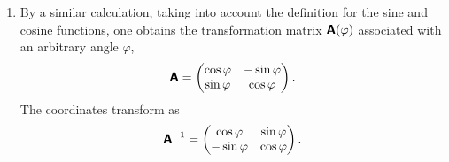 {\begin{enumerate}
\item
By a similar calculation, taking into account the definition for the sine and cosine functions,
one obtains the transformation matrix $\textsf{\textbf{A}}(\varphi )$
associated with an arbitrary angle $\varphi$,
\begin{equation}
 \textsf{\textbf{A}}
=
\begin{pmatrix}
\cos \varphi &-\sin \varphi\\
\sin \varphi &\cos \varphi
\end{pmatrix}
.
\label{2012-m-ch-fdvs-otd2}
\end{equation}
The coordinates transform as
\begin{equation}
 \textsf{\textbf{A}}^{-1}
=
\begin{pmatrix}
\cos \varphi &\sin \varphi\\
-\sin \varphi &\cos \varphi
\end{pmatrix}
.
\end{equation}


\end{enumerate}}
